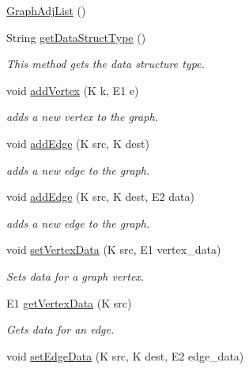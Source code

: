 \begin{DoxyCompactItemize}
\item 
\hyperlink{classbridges_1_1base_1_1_graph_adj_list_aba7e066f43d361418ae6bdf53a23b1de}{Graph\+Adj\+List} ()
\item 
String \hyperlink{classbridges_1_1base_1_1_graph_adj_list_a40c4a2faf20c9847e8ba0d8024236a4b}{get\+Data\+Struct\+Type} ()
\begin{DoxyCompactList}\small\item\em This method gets the data structure type. \end{DoxyCompactList}\item 
void \hyperlink{classbridges_1_1base_1_1_graph_adj_list_aca59a3c40af4ae82716ebbfa1751f267}{add\+Vertex} (K k, E1 e)
\begin{DoxyCompactList}\small\item\em adds a new vertex to the graph. \end{DoxyCompactList}\item 
void \hyperlink{classbridges_1_1base_1_1_graph_adj_list_a43041976184920e1db1dbe3ad696c6cd}{add\+Edge} (K src, K dest)
\begin{DoxyCompactList}\small\item\em adds a new edge to the graph. \end{DoxyCompactList}\item 
void \hyperlink{classbridges_1_1base_1_1_graph_adj_list_aa9fa3cbb6a90de43ee6f0d59c8dce329}{add\+Edge} (K src, K dest, E2 data)
\begin{DoxyCompactList}\small\item\em adds a new edge to the graph. \end{DoxyCompactList}\item 
void \hyperlink{classbridges_1_1base_1_1_graph_adj_list_aa80bfbbe9c4dd130632db1e1165d635e}{set\+Vertex\+Data} (K src, E1 vertex\+\_\+data)
\begin{DoxyCompactList}\small\item\em Sets data for a graph vertex. \end{DoxyCompactList}\item 
E1 \hyperlink{classbridges_1_1base_1_1_graph_adj_list_a3d5f73795bcd5011c425eaca33383454}{get\+Vertex\+Data} (K src)
\begin{DoxyCompactList}\small\item\em Gets data for an edge. \end{DoxyCompactList}\item 
void \hyperlink{classbridges_1_1base_1_1_graph_adj_list_a48041b13b10d5fb677f48a0debfc268e}{set\+Edge\+Data} (K src, K dest, E2 edge\+\_\+data)

\end{DoxyCompactItemize}
